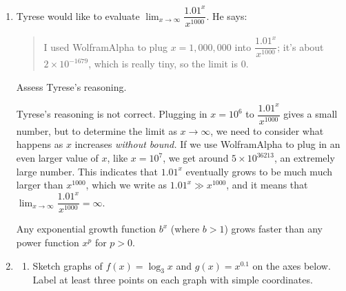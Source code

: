 \documentclass{article}
\begin{document}
\pspace{\newpage}

\begin{enumerate}[resume]
\item 


  \begin{problem}[1in]
    Tyrese would like to evaluate $\displaystyle \lim_{x \to \infty} \dfrac{1.01^x}{x^{1000}}$. He says:
    \begin{quote}
      I used WolframAlpha to plug $x = 1,000,000$ into $\dfrac{1.01^x}{x^{1000}}$; it's about $2 \times 10^{-1679}$, which is really tiny, so the limit is 0. 
    \end{quote}
    Assess Tyrese's reasoning. 
  \end{problem}

    \begin{solution}
      Tyrese's reasoning is not correct. Plugging in $x=10^6$
      to $\dfrac{1.01^x}{x^{1000}}$ gives a small number, but to determine
      the limit as $x\to\infty$, we need to consider what happens
      as $x$ increases \emph{without bound.} If we use WolframAlpha
      to plug in an even
      larger value of $x$, like $x=10^7$, we get around $5 \times 
      10^{36213}$, an extremely large number.
      This indicates that $1.01^x$ eventually grows to be
      much much larger than $x^{1000}$, which we write as
      $1.01^x \gg x^{1000}$, and it means that 
      $\displaystyle \lim_{x \to \infty} \dfrac{1.01^x}{x^{1000}}=\infty$.

      Any exponential growth function $b^x$ (where $b>1$)
      grows faster
      than any power function $x^p$ for $p>0$.
      \end{solution}



\item 

  \begin{enumerate}
  \item
    \begin{problem}
      Sketch graphs of $f(x) = \log_3 x$ and $g(x) = x^{0.1}$ on the axes below. Label at least three points on each graph with simple coordinates.
    \end{problem}


\end{enumerate}
\end{enumerate}
\end{document}
